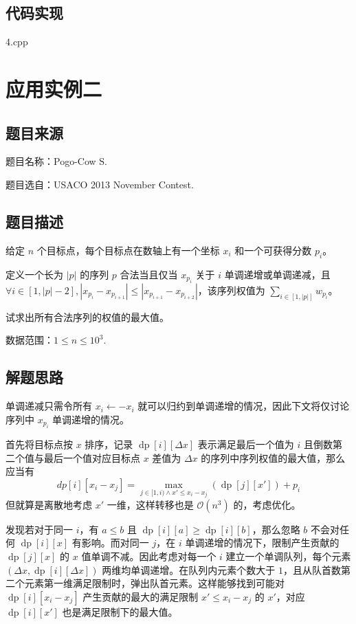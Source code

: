 \subsection{代码实现}

4.cpp

\section{应用实例二}

\subsection{题目来源}

题目名称：Pogo-Cow S.

题目选自：USACO 2013 November Contest.

\subsection{题目描述}

给定 \(n\) 个目标点，每个目标点在数轴上有一个坐标 \(x_i\)
和一个可获得分数 \(p_i\)。

定义一个长为 \(|p|\) 的序列 \(p\) 合法当且仅当 \(x_{p_i}\) 关于 \(i\)
单调递增或单调递减，且
\(\forall i\in[1,|p|-2],|x_{p_i}-x_{p_{i+1}}|\le |x_{p_{i+1}}-x_{p_{i+2}}|\)，该序列权值为
\(\sum_{i\in[1,|p|]}w_{p_i}\)。

试求出所有合法序列的权值的最大值。

数据范围：\(1\le n\le 10^3\).

\subsection{解题思路}

单调递减只需令所有 \(x_i\leftarrow -x_i\)
就可以归约到单调递增的情况，因此下文将仅讨论序列中 \(x_{p_i}\)
单调递增的情况。

首先将目标点按 \(x\) 排序，记录 \(\operatorname{dp}[i][\Delta x]\)
表示满足最后一个值为 \(i\) 且倒数第二个值与最后一个值对应目标点 \(x\)
差值为 \(\Delta x\) 的序列中序列权值的最大值，那么应当有 \[
dp[i][x_i-x_j]=\max_{j\in[1,i)\land x'\le x_i-x_j}(\operatorname{dp}[j][x'])+p_i
\] 但就算是离散地考虑 \(x'\) 一维，这样转移也是 \(\mathcal{O}(n^3)\)
的，考虑优化。

发现若对于同一 \(i\)，有 \(a\le b\) 且
\(\operatorname{dp}[i][a]\ge \operatorname{dp}[i][b]\)，那么忽略 \(b\)
不会对任何 \(\operatorname{dp}[i][x]\) 有影响。而对同一 \(j\)，在 \(i\)
单调递增的情况下，限制产生贡献的 \(\operatorname{dp}[j][x]\) 的 \(x\)
值单调不减。因此考虑对每一个 \(i\) 建立一个单调队列，每个元素
\((\Delta x,\operatorname{dp}[i][\Delta x])\)
两维均单调递增。在队列内元素个数大于
\(1\)，且从队首数第二个元素第一维满足限制时，弹出队首元素。这样能够找到可能对
\(\operatorname{dp}[i][x_i-x_j]\) 产生贡献的最大的满足限制
\(x'\le x_i-x_j\) 的 \(x'\)，对应 \(\operatorname{dp}[i][x']\)
也是满足限制下的最大值。

